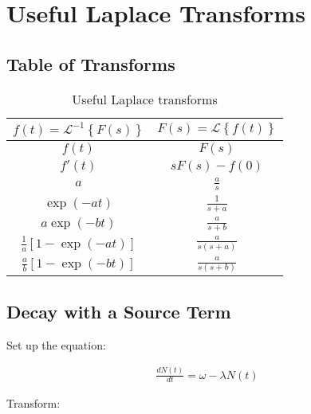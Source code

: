 \chapter{Useful Laplace Transforms}
\label{chapter:usefullaplacetransforms}

\section{Table of Transforms}

\begin{table}[h]
\begin{center}
\begin{tabular}{c c}
\hline\hline
$f(t) = \mathcal{L}^{-1}\left\{ F(s) \right\}$   &   $F(s) = \mathcal{L}\left\{ f(t) \right\} $ \\
\hline\hline
$f(t)$                                       & $F(s)$                  \\
$f'(t)$                                      & $sF(s) - f(0)$          \\
$a$                                          & $\frac{a}{s}$           \\
$\exp(-at)$                                   & $\frac{1}{s+a}$         \\
$a \exp(-bt)$                                 & $\frac{a}{s+b}$         \\
$\frac{1}{a} \left[1 - \exp(-at)\right]$      & $\frac{a}{s(s+a)}$      \\
$\frac{a}{b} \left[1 - \exp(-bt)\right]$      & $\frac{a}{s(s+b)}$      \\
\hline\hline
\end{tabular}
\end{center}
\caption{Useful Laplace transforms}
\label{table:usefullaplacetranforms}
\end{table}


\section{Decay with a Source Term}

Set up the equation:

\begin{equation}
\begin{split}
\frac{dN(t)}{dt} = \omega - \lambda N(t)
\end{split}
\label{eq:decaysourceterm1}
\end{equation}

Transform:

